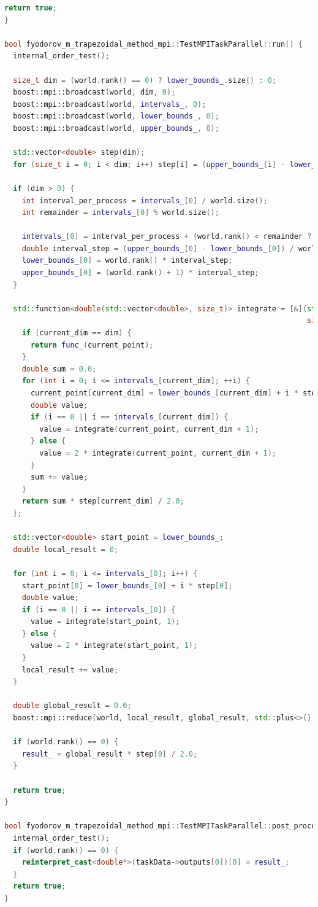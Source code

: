 \documentclass{article}
\begin{document}
\begin{lstlisting}[language=C++]
  return true;
}

bool fyodorov_m_trapezoidal_method_mpi::TestMPITaskParallel::run() {
  internal_order_test();

  size_t dim = (world.rank() == 0) ? lower_bounds_.size() : 0;
  boost::mpi::broadcast(world, dim, 0);
  boost::mpi::broadcast(world, intervals_, 0);
  boost::mpi::broadcast(world, lower_bounds_, 0);
  boost::mpi::broadcast(world, upper_bounds_, 0);

  std::vector<double> step(dim);
  for (size_t i = 0; i < dim; i++) step[i] = (upper_bounds_[i] - lower_bounds_[i]) / intervals_[i];

  if (dim > 0) {
    int interval_per_process = intervals_[0] / world.size();
    int remainder = intervals_[0] % world.size();

    intervals_[0] = interval_per_process + (world.rank() < remainder ? 1 : 0);
    double interval_step = (upper_bounds_[0] - lower_bounds_[0]) / world.size();
    lower_bounds_[0] = world.rank() * interval_step;
    upper_bounds_[0] = (world.rank() + 1) * interval_step;
  }

  std::function<double(std::vector<double>, size_t)> integrate = [&](std::vector<double> current_point,
                                                                     size_t current_dim) -> double {
    if (current_dim == dim) {
      return func_(current_point);
    }
    double sum = 0.0;
    for (int i = 0; i <= intervals_[current_dim]; ++i) {
      current_point[current_dim] = lower_bounds_[current_dim] + i * step[current_dim];
      double value;
      if (i == 0 || i == intervals_[current_dim]) {
        value = integrate(current_point, current_dim + 1);
      } else {
        value = 2 * integrate(current_point, current_dim + 1);
      }
      sum += value;
    }
    return sum * step[current_dim] / 2.0;
  };

  std::vector<double> start_point = lower_bounds_;
  double local_result = 0;

  for (int i = 0; i <= intervals_[0]; i++) {
    start_point[0] = lower_bounds_[0] + i * step[0];
    double value;
    if (i == 0 || i == intervals_[0]) {
      value = integrate(start_point, 1);
    } else {
      value = 2 * integrate(start_point, 1);
    }
    local_result += value;
  }

  double global_result = 0.0;
  boost::mpi::reduce(world, local_result, global_result, std::plus<>(), 0);

  if (world.rank() == 0) {
    result_ = global_result * step[0] / 2.0;
  }

  return true;
}

bool fyodorov_m_trapezoidal_method_mpi::TestMPITaskParallel::post_processing() {
  internal_order_test();
  if (world.rank() == 0) {
    reinterpret_cast<double*>(taskData->outputs[0])[0] = result_;
  }
  return true;
}

\end{lstlisting}
\end{document}
